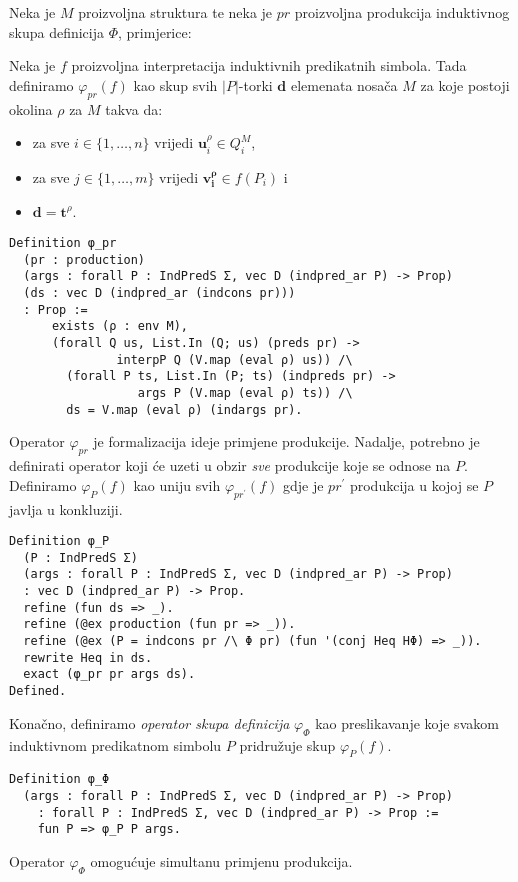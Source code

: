 \begin{definition}
  Neka je \(M\) proizvoljna struktura te neka je \(pr\) proizvoljna produkcija induktivnog skupa definicija \(\Phi\), primjerice:
  \begin{prooftree}
  \end{prooftree}
\noindent Neka je \(f\) proizvoljna interpretacija induktivnih predikatnih simbola.
Tada definiramo \(\varphi_{pr}(f)\) kao skup svih \(|P|\)-torki \(\mathbf{d}\) elemenata nosača \(M\) za koje postoji okolina \(\rho\) za \(M\) takva da:
\begin{itemize}
\item za sve \( i \in \{ 1, \ldots, n \} \) vrijedi \( \mathbf{u}_{i}^{\rho} \in Q_{i}^{M} \), %
\item za sve \( j \in \{ 1, \ldots, m \} \) vrijedi \( \mathbf{v_{i}^{\rho}} \in f(P_{i}) \) i
\item \(\mathbf{d} = \mathbf{t}^{\rho}\).
\end{itemize}
\begin{verbatim}
Definition φ_pr
  (pr : production)
  (args : forall P : IndPredS Σ, vec D (indpred_ar P) -> Prop)
  (ds : vec D (indpred_ar (indcons pr)))
  : Prop :=
      exists (ρ : env M),
      (forall Q us, List.In (Q; us) (preds pr) ->
               interpP Q (V.map (eval ρ) us)) /\
        (forall P ts, List.In (P; ts) (indpreds pr) ->
                  args P (V.map (eval ρ) ts)) /\
        ds = V.map (eval ρ) (indargs pr).
\end{verbatim}
\noindent Operator \(\varphi_{pr}\) je formalizacija ideje primjene produkcije.
Nadalje, potrebno je definirati operator koji će uzeti u obzir \textit{sve} produkcije koje se odnose na \(P\).
Definiramo \(\varphi_{P}(f)\) kao uniju svih \(\varphi_{pr^{\prime}}(f)\)
gdje je \(pr^{\prime}\) produkcija u kojoj se \(P\) javlja u konkluziji.
\begin{verbatim}
Definition φ_P
  (P : IndPredS Σ)
  (args : forall P : IndPredS Σ, vec D (indpred_ar P) -> Prop)
  : vec D (indpred_ar P) -> Prop.
  refine (fun ds => _).
  refine (@ex production (fun pr => _)).
  refine (@ex (P = indcons pr /\ Φ pr) (fun '(conj Heq HΦ) => _)).
  rewrite Heq in ds.
  exact (φ_pr pr args ds).
Defined.
\end{verbatim}
\noindent Konačno, definiramo \textit{operator skupa definicija} \(\varphi_{\Phi}\) kao preslikavanje
koje svakom induktivnom predikatnom simbolu \(P\) pridružuje skup \(\varphi_{P}(f)\).
\begin{verbatim}
Definition φ_Φ
  (args : forall P : IndPredS Σ, vec D (indpred_ar P) -> Prop)
    : forall P : IndPredS Σ, vec D (indpred_ar P) -> Prop :=
    fun P => φ_P P args.
\end{verbatim}
\noindent Operator \(\varphi_{\Phi}\) omogućuje simultanu primjenu produkcija.
\end{definition}

